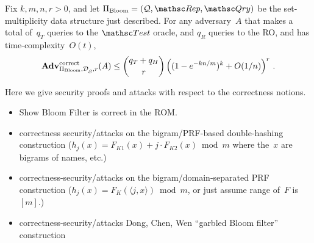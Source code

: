 \begin{theorem}\label{thm3}\label{thm:bf-correctness}
Fix $k,m,n,r>0$, and let $\Pi_{\mathrm{Bloom}}= (\calQ,\Rep, \Qry)$ be the set-multiplicity data structure just described. For any adversary~$A$ that makes a total of~$q_T$ queries to the $\Test$ oracle, and $q_R$ queries to the RO, and has time-complexity~$O(t)$,
\[
\mathrm{\mathbf{Adv}}^{\mathrm{correct}}_{\Pi_{\mathrm{Bloom}},\mathcal{D}_{{\cal S}}^{},r}(A) \leq  {\dbinom{q_T + q_H}{r}} \left( (1-e^{-kn/m})^k + O(1/n) \right)^r\,.
\]
\end{theorem}




  Here we give security proofs and attacks with respect to the correctness notions.
\begin{itemize}
\item Show Bloom Filter is correct in the ROM. 
\item correctness security/attacks on the bigram/PRF-based double-hashing construction ($h_j(x) = F_{K1}(x) + j\cdot F_{K2}(x) \bmod m$ where the~$x$ are bigrams of names, etc.)
\item correctness-security/attacks on the bigram/domain-separated PRF construction ($h_j(x)=F_K(\langle j,x \rangle) \bmod m$, or just assume range of~$F$ is $[m]$.) 
\item correctness-security/attacks Dong, Chen, Wen ``garbled Bloom filter'' construction

\end{itemize}

